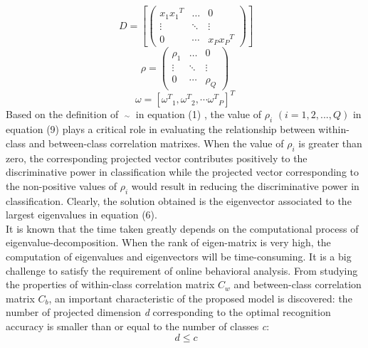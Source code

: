 \documentclass[10pt,journal,compsoc]{IEEEtran}
\begin{document}
\begin{equation} \ D = \left[ {\left( {\begin{array}{*{20}{c}}
{{x_1}{x_1}^T}& \ldots &0\\
 \vdots & \ddots & \vdots \\
0& \cdots &{{x_P}{x_P}^T}
\end{array}} \right)} \right] \end{equation}
\begin{equation}
\rho  = \left( {\begin{array}{*{20}{c}}
{{\rho _1}}& \ldots &0\\
 \vdots & \ddots & \vdots \\
0& \cdots &{{\rho _Q}}
\end{array}} \right)
 \end{equation}
\begin{equation} \omega  = [{\omega ^T}_1,{\omega ^T}_2, \cdots {\omega ^T}_P]^T \end{equation}
Based on the definition of $\mathop {{C_{{x_k}{x_m}}}}\limits^ \sim  $ in equation (1) , the value of ${\rho _i}$ $(i = 1,2,...,Q)$ in equation (9) plays a critical role in evaluating the relationship between within-class and between-class correlation matrixes. When the value of ${\rho _i}$ is greater than zero, the corresponding projected vector contributes positively to the discriminative power in classification while the projected vector corresponding to the non-positive values of ${\rho _i}$ would result in reducing the discriminative power in classification. Clearly, the solution obtained is the eigenvector associated to the largest eigenvalues in equation (6). \\\indent It is known that the time taken greatly depends on the computational process of eigenvalue-decomposition. When the rank of eigen-matrix is very high, the computation of eigenvalues and eigenvectors will be time-consuming. It is a big challenge to satisfy the requirement of online behavioral analysis. From studying the properties of within-class correlation matrix $C_w$ and between-class correlation matrix $C_b$, an important characteristic of the proposed model is discovered: the number of projected dimension \emph{d} corresponding to the optimal recognition accuracy is smaller than or equal to the number of classes \textit{c}:
\begin{equation} \ d \le c \end{equation}
\end{document}

